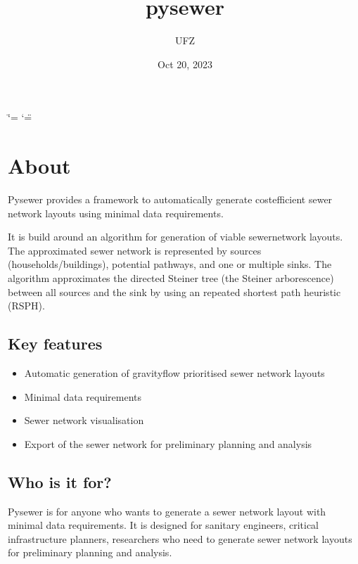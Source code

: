 \documentclass[letterpaper,10pt,english]{sphinxmanual}
\title{pysewer}
\date{Oct 20, 2023}
\author{UFZ}
\begin{document}
\ifdefined\shorthandoff
  \ifnum\catcode`\=\string=\active\shorthandoff{=}\fi
  \ifnum\catcode`\"=\active{}\fi
\fi

\pagestyle{empty}
\sphinxmaketitle
\pagestyle{plain}
\sphinxtableofcontents
\pagestyle{normal}
\label{\detokenize{index::doc}}


\sphinxstepscope


\chapter{About}
\label{\detokenize{about:about}}\label{\detokenize{about::doc}}
\sphinxAtStartPar
Pysewer provides a framework to automatically generate cost\sphinxhyphen{}efficient sewer network layouts using minimal data requirements.

\sphinxAtStartPar
It is build around an algorithm for generation of viable sewer\sphinxhyphen{}network layouts. The approximated sewer network is represented by sources (households/buildings), potential pathways, and one or multiple sinks.
The algorithm approximates the directed Steiner tree (the Steiner arborescence) between all sources and the sink by using an repeated shortest path heuristic (RSPH).


\section{Key features}
\label{\detokenize{about:key-features}}\begin{itemize}
\item {} 
\sphinxAtStartPar
Automatic generation of gravity\sphinxhyphen{}flow prioritised sewer network layouts

\item {} 
\sphinxAtStartPar
Minimal data requirements

\item {} 
\sphinxAtStartPar
Sewer network visualisation

\item {} 
\sphinxAtStartPar
Export of the sewer network for preliminary planning and analysis

\end{itemize}


\section{Who is it for?}
\label{\detokenize{about:who-is-it-for}}
\sphinxAtStartPar
Pysewer is for anyone who wants to generate a sewer network layout with minimal data requirements.
It is designed for sanitary engineers, critical infrastructure planners, researchers who need to generate sewer network layouts for preliminary planning and analysis.
\end{document}
